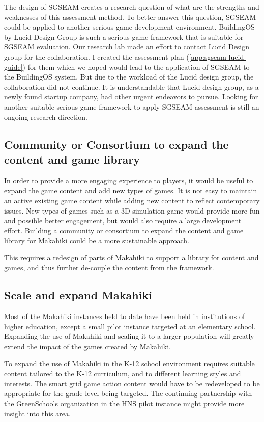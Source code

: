 The design of SGSEAM creates a research question of what are the strengths and weaknesses of this assessment method. To better answer this question, SGSEAM could be applied to another serious game development environment. BuildingOS\cite{building-dashboard} by Lucid Design Group is such a serious game framework that is suitable for SGSEAM evaluation. Our research lab made an effort to contact Lucid Design group for the collaboration. I created the assessment plan (\autoref{app:sgseam-lucid-guide}) for them which we hoped would lead to the application of SGSEAM to the BuildingOS system. But due to the workload of the Lucid design group, the collaboration did not continue. It is understandable that Lucid design group, as a newly found startup company, had other urgent endeavors to pursue. Looking for another suitable serious game framework to apply SGSEAM assessment is still an ongoing research direction.

\subsection{Community or Consortium to expand the content and game library}

In order to provide a more engaging experience to players, it would be useful to expand the game content and add new types of games. It is not easy to maintain an active existing game content while adding new content to reflect contemporary issues. New types of games such as a 3D simulation game would provide more fun and possible better engagement, but would also require a large development effort. Building a community or consortium to expand the content and game library for Makahiki could be a more sustainable approach. 

This requires a redesign of parts of Makahiki to support a library for content and games, and thus further de-couple the content from the framework.

\subsection{Scale and expand Makahiki}

Most of the Makahiki instances held to date have been held in institutions of higher education, except a small pilot instance targeted at an elementary school. Expanding the use of Makahiki and scaling it to a larger population will greatly extend the impact of the games created by Makahiki.

To expand the use of Makahiki in the K-12 school environment requires suitable content tailored to the K-12 curriculum, and to different learning styles and interests. The smart grid game action content would have to be redeveloped to be appropriate for the grade level being targeted. The continuing partnership with the GreenSchools organization in the HNS pilot instance might provide more insight into this area.

